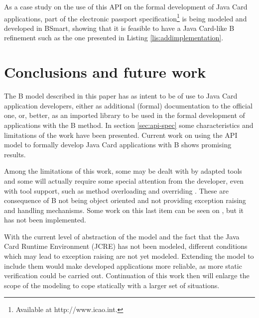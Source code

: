 \documentclass{llncs}
\begin{document}
As a case study on the use of this API on the formal development of Java Card applications, part of the electronic passport specification\footnote{Available at http://www.icao.int.} is being modeled and developed in BSmart, showing that it is feasible to have a Java Card-like B refinement  such as the one presented in Listing \ref{lis:addimplementation}.

\section{Conclusions and future work}\label{sec:conc}

The B model described in this paper has as intent to be of use to Java Card application developers, either as additional (formal) documentation to the official one, or, better, as an imported library to be used in the formal development of applications with the B method. In section \ref{sec:api-spec} some characteristics and limitations of the work have been presented. Current work on using the API model to formally develop Java Card applications with B shows promising results. 

Among the limitations of this work, some may be dealt with by adapted tools and some will actually require some special attention from the developer, even with tool support, such as method overloading and overriding . These are consequence of B not being object oriented and not providing exception raising and handling mechanisms. Some work on this last item can be seen on \cite{BR2003}, but it has not been implemented.

With the current level of abstraction of the model and the fact that the Java Card Runtime Environment (JCRE) has not been modeled, different conditions which may lead to exception raising are not yet modeled. Extending the model to include them would make developed applications more reliable, as more static verification could be carried
out. Continuation of this work then will enlarge the scope of the modeling to cope statically with a larger set of situations.



\end{document}
